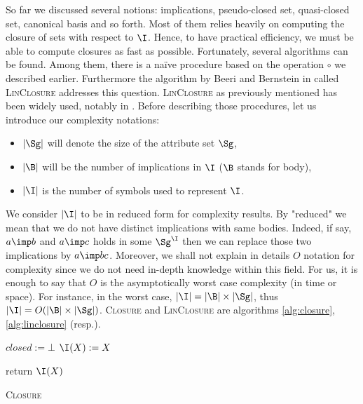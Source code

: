 \vspace{1.2em}

So far we discussed several notions: implications, pseudo-closed set, 
quasi-closed set, canonical basis and so forth. Most of them relies heavily on
computing the closure of sets with respect to $\I$. Hence, to have practical 
efficiency, we must be able to compute closures as fast as possible. 
Fortunately, several algorithms can be found. Among them, there is a naïve
procedure based on the operation $\circ$ we described earlier. Furthermore the 
algorithm by Beeri and Bernstein in \cite{beeri_computational_1979} called 
\textsc{LinClosure} addresses this question. \textsc{LinClosure} as previously 
mentioned has been widely used, notably in \cite{maier_theory_1983, 
david_minimum_1980, b._ganter_conceptual_2016, shock_computing_1986, 
day_lattice_1992}. Before describing those procedures, let us introduce our 
complexity notations:
\begin{itemize}
	\item $|\Sg|$ will denote the size of the attribute set $\Sg$,
	\item $|\B|$ will be the number of implications in $\I$ ($\B$ stands
	for body),
	\item $|\I|$ is the number of symbols used to represent $\I$.
\end{itemize}
We consider $|\I|$ to be in reduced form for complexity results. By "reduced" 
we mean that we do not have distinct implications with same bodies. Indeed, if
say, $a \imp b$ and $a \imp c$ holds in some $\Sg^{\I}$ then we can replace 
those two implications by $a \imp bc$. Moreover, we shall not explain in details
$O$ notation for complexity since we do not need in-depth knowledge within 
this field. For us, it is enough to say that $O$ is the 
asymptotically worst case complexity (in time or space). For instance, in the 
worst case, $|\I| = |\B|\times|\Sg|$, thus $|\I| = O(|\B|\times|\Sg|)$. 
\textsc{Closure} and \textsc{LinClosure} are algorithms \ref{alg:closure}, 
\ref{alg:linclosure} (resp.). 

\vspace{1.2em}

\begin{algorithm}[ht]

\BlankLine
\BlankLine

$closed := \bot$ \;
$\I(X) := X$ \;

\BlankLine

return $\I(X)$\;

\caption{\textsc{Closure}}
\label{alg:closure}
\end{algorithm}


